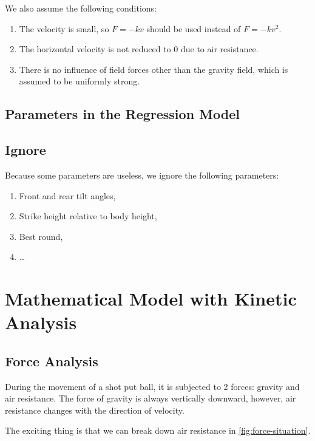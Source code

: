 \documentclass{article}
\begin{document}
We also assume the following conditions:

\begin{enumerate}
    \item The velocity is small, so $F=-kv$ should be used instead of $F=-kv^2$.
    \item The horizontal velocity is not reduced to $0$ due to air resistance.
    \item There is no influence of field forces other than the gravity field, which is assumed to be uniformly strong.
\end{enumerate}

\subsection{Parameters in the Regression Model}

\subsection{Ignore}

Because some parameters are useless, we ignore the following parameters:

\begin{enumerate}
    \item Front and rear tilt angles,
    \item Strike height relative to body height,
    \item Best round,
    \item \dots
\end{enumerate}

\section{Mathematical Model with Kinetic Analysis}

\label{section:mathematics-model}

\subsection{Force Analysis}

During the movement of a shot put ball, it is subjected to 2 forces: gravity and air resistance. The force of gravity is always vertically downward, however, air resistance changes with the direction of velocity.

The exciting thing is that we can break down air resistance in \ref{fig:force-situation}.
\end{document}
